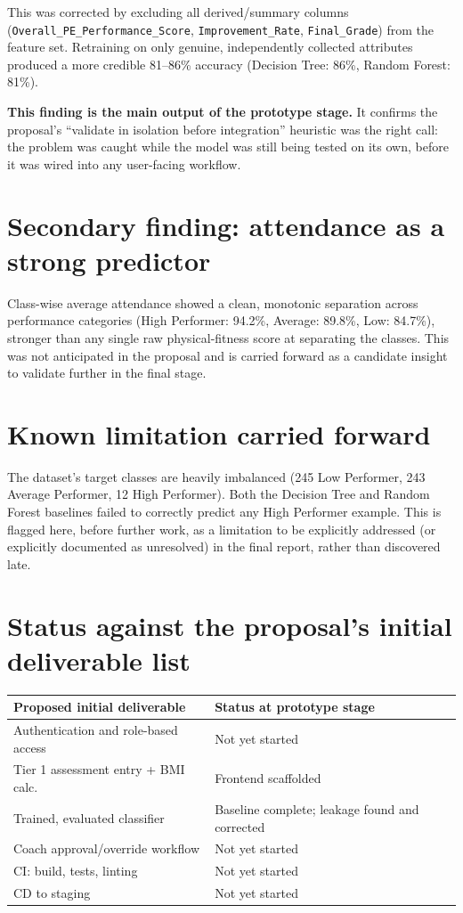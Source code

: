 \documentclass[11pt,a4paper]{article}
\begin{document}
This was corrected by excluding all derived/summary columns
(\texttt{Overall\_PE\_Performance\_Score},
\texttt{Improvement\_Rate}, \texttt{Final\_Grade}) from the
feature set. Retraining on only genuine, independently
collected attributes produced a more credible 81--86\%
accuracy (Decision Tree: 86\%, Random Forest: 81\%).

\textbf{This finding is the main output of the prototype
stage.} It confirms the proposal's ``validate in isolation
before integration'' heuristic was the right call: the
problem was caught while the model was still being tested
on its own, before it was wired into any user-facing
workflow.

\section{Secondary finding: attendance as a strong predictor}
Class-wise average attendance showed a clean, monotonic
separation across performance categories (High Performer:
94.2\%, Average: 89.8\%, Low: 84.7\%), stronger than any
single raw physical-fitness score at separating the
classes. This was not anticipated in the proposal and is
carried forward as a candidate insight to validate further
in the final stage.

\section{Known limitation carried forward}
The dataset's target classes are heavily imbalanced (245
Low Performer, 243 Average Performer, 12 High Performer).
Both the Decision Tree and Random Forest baselines failed
to correctly predict any High Performer example. This is
flagged here, before further work, as a limitation to be
explicitly addressed (or explicitly documented as
unresolved) in the final report, rather than discovered
late.

\section{Status against the proposal's initial deliverable list}
\begin{center}
\begin{tabular}{@{}p{6.5cm}p{4.5cm}@{}}
\toprule
Proposed initial deliverable & Status at prototype stage \\
\midrule
Authentication and role-based access & Not yet started \\
Tier 1 assessment entry + BMI calc. & Frontend scaffolded \\
Trained, evaluated classifier & Baseline complete; leakage found and corrected \\
Coach approval/override workflow & Not yet started \\
CI: build, tests, linting & Not yet started \\
CD to staging & Not yet started \\
\bottomrule
\end{tabular}
\end{center}
\end{document}
